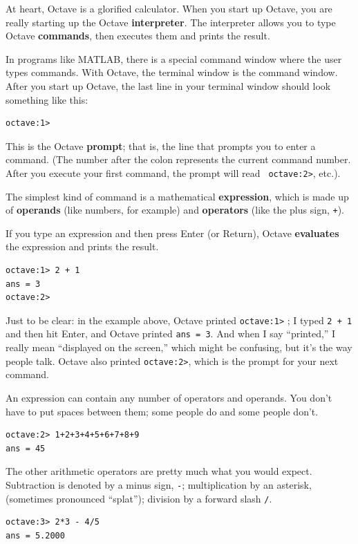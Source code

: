 \documentclass{book}
\begin{document}
At heart, Octave is a glorified calculator. When you start up Octave, you are
really starting up the Octave {\bf interpreter}. The interpreter allows you to
type Octave {\bf commands}, then executes them and prints the result.

In programs like MATLAB, there is a special command window where the user types
commands. With Octave, the terminal window is the command window. After you
start up Octave, the last line in your terminal window should look something
like this:
%
\begin{verbatim}
octave:1>
\end{verbatim}
%
This is the Octave {\bf prompt}; that is, the line that prompts you to
enter a command. (The number after the colon represents the current command
number. After you execute your first command, the prompt will read {\tt
octave:2>}, etc.).

The simplest kind of command is a mathematical {\bf expression}, which
is made up of {\bf operands} (like numbers, for example) and
{\bf operators} (like the plus sign, {\tt +}).

If you type an expression and then press Enter (or Return), Octave
{\bf evaluates} the expression and prints the result.

\begin{verbatim}
octave:1> 2 + 1
ans = 3
octave:2>
\end{verbatim}

Just to be clear: in the example above, Octave printed {\tt octave:1>} ; I
typed {\tt 2 + 1} and then hit Enter, and Octave printed {\tt ans = 3}.
And when I say ``printed,'' I really mean ``displayed on the screen,''
which might be confusing, but it's the way people talk. Octave also printed
{\tt octave:2>}, which is the prompt for your next command.

An expression can contain any number of operators and operands. You
don't have to put spaces between them; some people do and some people
don't.

\begin{verbatim}
octave:2> 1+2+3+4+5+6+7+8+9
ans = 45
\end{verbatim}

The other arithmetic operators are pretty much what you would expect.
Subtraction is denoted by a minus sign, {\tt -}; multiplication by
an asterisk, {\tt *} (sometimes pronounced ``splat''); division by
a forward slash {\tt /}.

\begin{verbatim}
octave:3> 2*3 - 4/5
ans = 5.2000
\end{verbatim}
\end{document}
